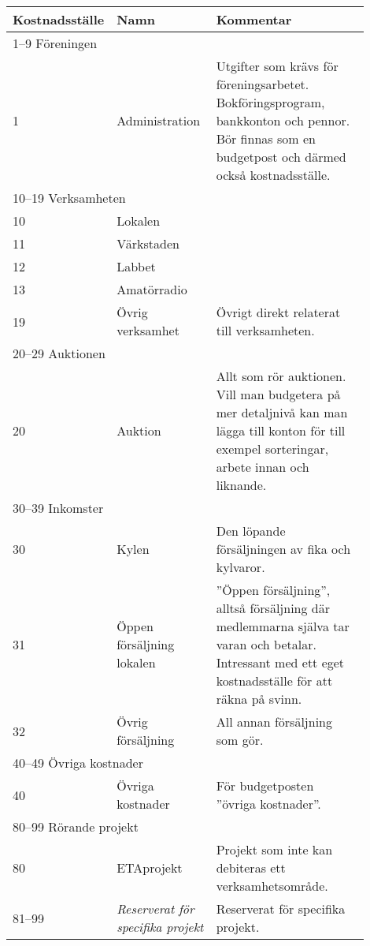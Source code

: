 \begin{longtable}[l]{l p{0.3\linewidth} p{0.6\linewidth}}
	Kostnadsställe	&	Namn								& Kommentar \\ \toprule \endhead
	\multicolumn{3}{l}{1--9 Föreningen}\\
	1				&	Administration						& Utgifter som krävs för föreningsarbetet. Bokföringsprogram, bankkonton och pennor. Bör finnas som en budgetpost och därmed också kostnadsställe.\\
	\multicolumn{3}{l}{10--19 Verksamheten}\\
	10				&	Lokalen\\
	11				&	Värkstaden\\
	12				&	Labbet\\
	13				&	Amatörradio\\
	19				&	Övrig verksamhet					& Övrigt direkt relaterat till verksamheten.\\
	\multicolumn{3}{l}{20--29 Auktionen}\\
	20				&	Auktion								& Allt som rör auktionen. Vill man budgetera på mer detaljnivå kan man lägga till konton för till exempel sorteringar, arbete innan och liknande.\\
	\multicolumn{3}{l}{30--39 Inkomster}\\
	30				&	Kylen								& Den löpande försäljningen av fika och kylvaror.\\
	31				&	Öppen försäljning lokalen			& ”Öppen försäljning”, alltså försäljning där medlemmarna själva tar varan och betalar. Intressant med ett eget kostnadsställe för att räkna på svinn.\\
	32				&	Övrig försäljning					& All annan försäljning som \acr{eta} gör.\\
	\multicolumn{3}{l}{40--49 Övriga kostnader}\\
	40				&	Övriga kostnader					& För budgetposten ”övriga kostnader”.
	\multicolumn{3}{l}{50--79 \emph{Ej använda}}\\
	\multicolumn{3}{l}{80--99 Rörande projekt}\\
	80				&	ETAprojekt							& Projekt som inte kan debiteras ett verksamhetsområde.\\
	81--99			&	\emph{Reserverat för specifika projekt} & Reserverat för specifika projekt.\\
\end{longtable}